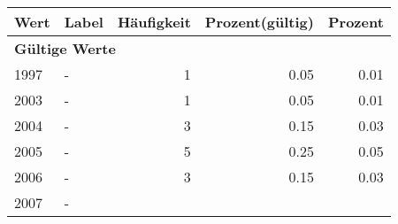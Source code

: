      \begin{longtable}{lXrrr}
     \toprule
     \textbf{Wert} & \textbf{Label} & \textbf{Häufigkeit} & \textbf{Prozent(gültig)} & \textbf{Prozent} \\
     \endhead
     \midrule
     \multicolumn{5}{l}{\textbf{Gültige Werte}}\\

     1997 &
     \multicolumn{1}{X}{ -  } &


       \num{1} &
       \num[round-mode=places,round-precision=2]{0,05} &
         \num[round-mode=places,round-precision=2]{0,01} \\

     2003 &
     \multicolumn{1}{X}{ -  } &


       \num{1} &
       \num[round-mode=places,round-precision=2]{0,05} &
         \num[round-mode=places,round-precision=2]{0,01} \\

     2004 &
     \multicolumn{1}{X}{ -  } &


       \num{3} &
       \num[round-mode=places,round-precision=2]{0,15} &
         \num[round-mode=places,round-precision=2]{0,03} \\

     2005 &
     \multicolumn{1}{X}{ -  } &


       \num{5} &
       \num[round-mode=places,round-precision=2]{0,25} &
         \num[round-mode=places,round-precision=2]{0,05} \\

     2006 &
     \multicolumn{1}{X}{ -  } &


       \num{3} &
       \num[round-mode=places,round-precision=2]{0,15} &
         \num[round-mode=places,round-precision=2]{0,03} \\

     2007 &
     \multicolumn{1}{X}{ -  } &



\end{longtable}
